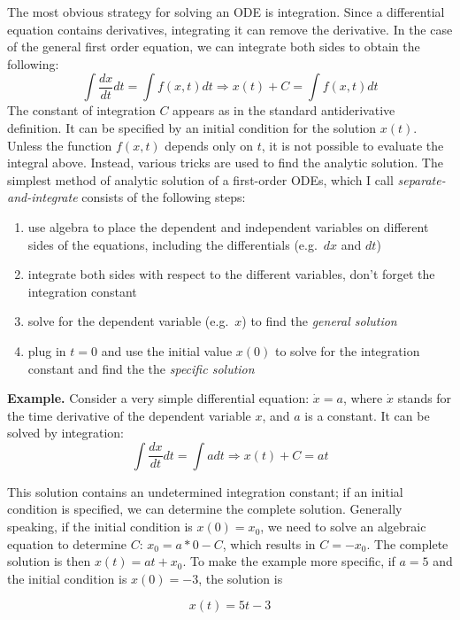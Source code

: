 \documentclass[
]{book}
\providecommand{\tightlist}{%
  \setlength{\itemsep}{0pt}\setlength{\parskip}{0pt}}
\theoremstyle{definition}
\theoremstyle{definition}
\theoremstyle{definition}
\theoremstyle{remark}
\begin{document}
The most obvious strategy for solving an ODE is integration. Since a differential equation contains derivatives, integrating it can remove the derivative. In the case of the general first order equation, we can integrate both sides to obtain the following:
\[ \int \frac{dx}{dt} dt = \int f(x,t) dt \Rightarrow x(t) + C = \int f(x,t) dt\]
The constant of integration \(C\) appears as in the standard antiderivative definition. It can be specified by an initial condition for the solution \(x(t)\). Unless the function \(f(x,t)\) depends only on \(t\), it is not possible to evaluate the integral above. Instead, various tricks are used to find the analytic solution. The simplest method of analytic solution of a first-order ODEs, which I call  \emph{separate-and-integrate} consists of the following steps:

\begin{enumerate}
\def\labelenumi{\arabic{enumi}.}
\tightlist
\item
  use algebra to place the dependent and independent variables on different sides of the equations, including the differentials (e.g.~\(dx\) and \(dt\))
\item
  integrate both sides with respect to the different variables, don't forget the integration constant
\item
  solve for the dependent variable (e.g.~\(x\)) to find the \emph{general solution}
\item
  plug in \(t=0\) and use the initial value \(x(0)\) to solve for the integration constant and find the the \emph{specific solution}
\end{enumerate}

\textbf{Example.} Consider a very simple differential equation: \(\dot x = a\), where \(\dot x\) stands for the time derivative of the dependent variable \(x\), and \(a\) is a constant. It can be solved by integration:
\[ \int \frac{dx}{dt} dt  = \int a dt  \Rightarrow x(t) + C = at \]

This solution contains an undetermined integration constant; if an initial condition is specified, we can determine the complete solution. Generally speaking, if the initial condition is \(x(0) = x_0\), we need to solve an algebraic equation to determine \(C\): \(x_0 = a*0 - C\), which results in \(C = -x_0\). The complete solution is then \(x(t) = at + x_0\). To make the example more specific, if \(a = 5\) and the initial condition is \(x(0) = -3\), the solution is

\[x(t) = 5t -3\]
\end{document}
